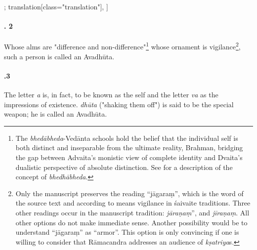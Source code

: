 \begin{alignment}[
  texts=edition[class="edition"];
  translation[class="translation"],
  ]
\begin{translation}
\begin{tlate}[44_2]
      \paragraph{. 2} Whose alms are "difference and non-difference"\footnote{The \textit{bhedābheda}-Vedānta schools hold the belief that the individual self is both distinct and inseparable from the ultimate reality, Brahman, bridging the gap between Advaita's monistic view of complete identity and Dvaita's dualistic perspective of absolute distinction. See \citeauthor[2023]{bhedabheda} for a description of the concept of \textit{bhedhābheda}.} whose ornament is vigilance\footnote{Only the manuscript  preserves the reading ``jāgaraṃ'', which is the word of the source text and according to  \citeauthor[1963:134f.]{brunner1963} means vigilance in śaivaite traditions. Three other readings occur in the manuscript tradition: \textit{jāraṇaṃ}'', and \textit{jīraṇaṃ}. All other options do not make immediate sense. Another possibility would be to understand ``jāgaraṃ'' as ``armor''. This option is only convincing if one is willing to consider that Rāmacandra addresses an audience of \textit{kṣatriya}s.}, such a person is called an Avadhūta.%
    \end{tlate}
    \begin{tlate}[44_3]
      \paragraph{.3} The letter \textit{a} is, in fact, to be known as the self and the letter \textit{va} as the impressions of existence. \textit{dhūta} ("shaking them off") is said to be the special weapon; he is called an Avadhūta.
    \end{tlate}
    \begin{tlate}[44_4]

\end{tlate}
\end{translation}
\end{alignment}
